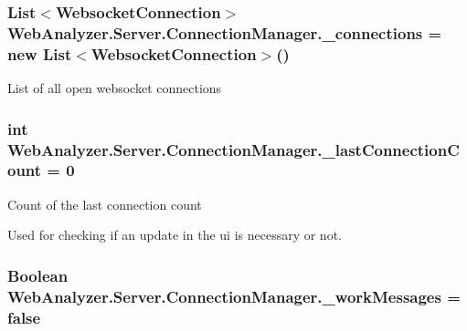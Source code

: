 \subsubsection[{\+\_\+connections}]{\setlength{\rightskip}{0pt plus 5cm}List$<${\bf Websocket\+Connection}$>$ Web\+Analyzer.\+Server.\+Connection\+Manager.\+\_\+connections = new List$<${\bf Websocket\+Connection}$>$()\hspace{0.3cm}{\ttfamily [private]}}\label{class_web_analyzer_1_1_server_1_1_connection_manager_a4d1d80f0e1bca824c36908efcc4f9dc0}


List of all open websocket connections 

\hypertarget{class_web_analyzer_1_1_server_1_1_connection_manager_a26374e3936745ea45ecf5f77e4d8884f}{}
\subsubsection[{\+\_\+last\+Connection\+Count}]{\setlength{\rightskip}{0pt plus 5cm}int Web\+Analyzer.\+Server.\+Connection\+Manager.\+\_\+last\+Connection\+Count = 0\hspace{0.3cm}{\ttfamily [private]}}\label{class_web_analyzer_1_1_server_1_1_connection_manager_a26374e3936745ea45ecf5f77e4d8884f}


Count of the last connection count 

Used for checking if an update in the ui is necessary or not. \hypertarget{class_web_analyzer_1_1_server_1_1_connection_manager_a23a1f3a046b14bcb1333c3ef846015d6}{}
\subsubsection[{\+\_\+work\+Messages}]{\setlength{\rightskip}{0pt plus 5cm}Boolean Web\+Analyzer.\+Server.\+Connection\+Manager.\+\_\+work\+Messages = {\bf false}\hspace{0.3cm}{\ttfamily [private]}}\label{class_web_analyzer_1_1_server_1_1_connection_manager_a23a1f3a046b14bcb1333c3ef846015d6}


